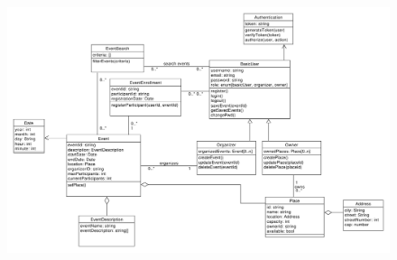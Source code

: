 \documentclass[9pt]{extarticle}
\begin{document}
\begin{figure}[!htb]
	\centering
	\includegraphics[width=\linewidth]{./images/classDiagram.pdf}
	\caption{}
	\label{fig:classDiagram}
\end{figure}



	
\end{document}
